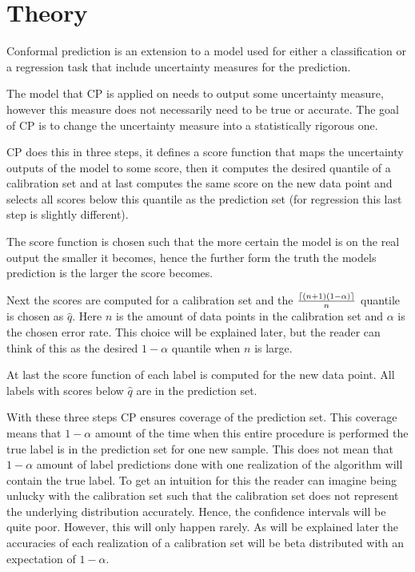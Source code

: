 \section{Theory}
Conformal prediction is an extension to a model used for either a classification or a regression task that include uncertainty measures for the prediction. %

The model that CP is applied on needs to output some uncertainty measure, however this measure does not necessarily need to be true or accurate. The goal of CP is to change the uncertainty measure into a statistically rigorous one. 

CP does this in three steps, it defines a score function that maps the uncertainty outputs of the model to some score, then it computes the desired quantile of a calibration set and at last computes the same score on the new data point and selects all scores below this quantile as the prediction set (for regression this last step is slightly different). 

The score function is chosen such that the more certain the model is on the real output the smaller it becomes, hence the further form the truth the models prediction is the larger the score becomes. 

Next the scores are computed for a calibration set and the $\frac{\lceil {(n+1)(1 - \alpha)} \rceil}{n}$ quantile is chosen as $\hat{q}$. Here $n$ is the amount of data points in the calibration set and $\alpha$ is the chosen error rate. This choice will be explained later, but the reader can think of this as the desired $1 - \alpha$ quantile when $n$ is large. 

At last the score function of each label is computed for the new data point. All labels with scores below $\hat{q}$ are in the prediction set. 

With these three steps CP ensures coverage of the prediction set. This coverage means that $1 - \alpha$ amount of the time when this entire procedure is performed the true label is in the prediction set for one new sample. This does not mean that $1 - \alpha$ amount of label predictions done with one realization of the algorithm will contain the true label. To get an intuition for this the reader can imagine being unlucky with the calibration set such that the calibration set does not represent the underlying distribution accurately. Hence, the confidence intervals will be quite poor. However, this will only happen rarely. As will be explained later the accuracies of each realization of a calibration set will be beta distributed with an expectation of $1 - \alpha$. 

